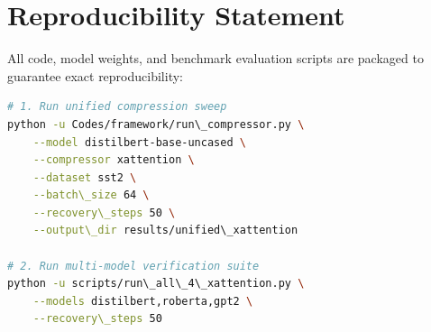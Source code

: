 \section{Reproducibility Statement}
All code, model weights, and benchmark evaluation scripts are packaged to guarantee exact reproducibility:
\begin{lstlisting}[language=bash]
# 1. Run unified compression sweep
python -u Codes/framework/run\_compressor.py \
    --model distilbert-base-uncased \
    --compressor xattention \
    --dataset sst2 \
    --batch\_size 64 \
    --recovery\_steps 50 \
    --output\_dir results/unified\_xattention

# 2. Run multi-model verification suite
python -u scripts/run\_all\_4\_xattention.py \
    --models distilbert,roberta,gpt2 \
    --recovery\_steps 50
\end{lstlisting}
